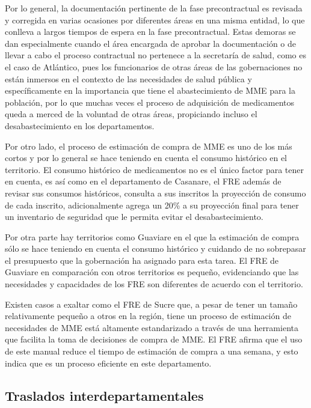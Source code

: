 \documentclass[
]{book}
\begin{document}
Por lo general, la documentación pertinente de la fase precontractual es revisada y corregida en varias ocasiones por diferentes áreas en una misma entidad, lo que conlleva a largos tiempos de espera en la fase precontractual. Estas demoras se dan especialmente cuando el área encargada de aprobar la documentación o de llevar a cabo el proceso contractual no pertenece a la secretaría de salud, como es el caso de Atlántico, pues los funcionarios de otras áreas de las gobernaciones no están inmersos en el contexto de las necesidades de salud pública y específicamente en la importancia que tiene el abastecimiento de MME para la población, por lo que muchas veces el proceso de adquisición de medicamentos queda a merced de la voluntad de otras áreas, propiciando incluso el desabastecimiento en los departamentos.

Por otro lado, el proceso de estimación de compra de MME es uno de los más cortos y por lo general se hace teniendo en cuenta el consumo histórico en el territorio. El consumo histórico de medicamentos no es el único factor para tener en cuenta, es así como en el departamento de Casanare, el FRE además de revisar sus consumos históricos, consulta a sus inscritos la proyección de consumo de cada inscrito, adicionalmente agrega un 20\% a su proyección final para tener un inventario de seguridad que le permita evitar el desabastecimiento.

Por otra parte hay territorios como Guaviare en el que la estimación de compra sólo se hace teniendo en cuenta el consumo histórico y cuidando de no sobrepasar el presupuesto que la gobernación ha asignado para esta tarea. El FRE de Guaviare en comparación con otros territorios es pequeño, evidenciando que las necesidades y capacidades de los FRE son diferentes de acuerdo con el territorio.

Existen casos a exaltar como el FRE de Sucre que, a pesar de tener un tamaño relativamente pequeño a otros en la región, tiene un proceso de estimación de necesidades de MME está altamente estandarizado a través de una herramienta que facilita la toma de decisiones de compra de MME. El FRE afirma que el uso de este manual reduce el tiempo de estimación de compra a una semana, y esto indica que es un proceso eficiente en este departamento.

\hypertarget{traslados-interdepartamentales}{%
\subsection{Traslados interdepartamentales}\label{traslados-interdepartamentales}}
\end{document}
